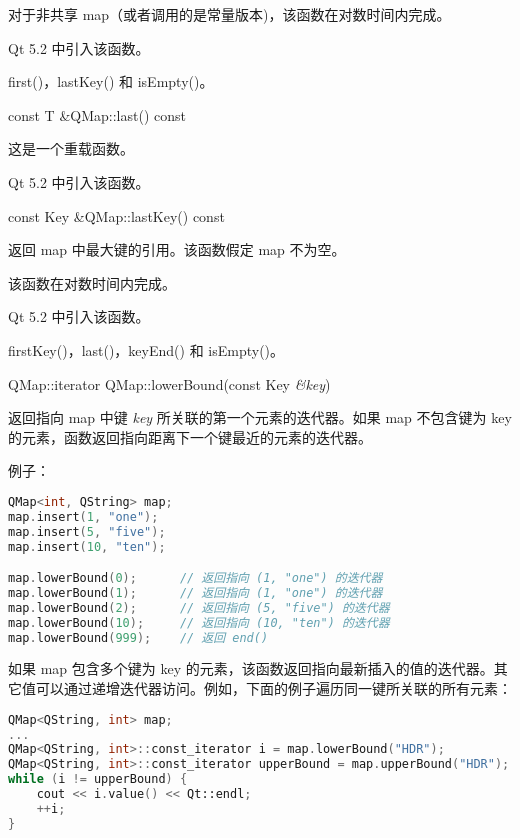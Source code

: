 对于非共享 map（或者调用的是常量版本)，该函数在对数时间内完成。

Qt 5.2 中引入该函数。

\begin{seeAlso}
first()，lastKey() 和 isEmpty()。
\end{seeAlso}

\splitLine

const T \&QMap::last() const

这是一个重载函数。

Qt 5.2 中引入该函数。

\splitLine

const Key \&QMap::lastKey() const

返回 map 中最大键的引用。该函数假定 map 不为空。

该函数在对数时间内完成。

Qt 5.2 中引入该函数。

\begin{seeAlso}
firstKey()，last()，keyEnd() 和 isEmpty()。
\end{seeAlso}

\splitLine

QMap::iterator QMap::lowerBound(const Key \emph{\&key})

返回指向 map 中键 \emph{key} 所关联的第一个元素的迭代器。如果 map 不包含键为 key 的元素，函数返回指向距离下一个键最近的元素的迭代器。

例子：

\begin{lstlisting}[language=C++]
QMap<int, QString> map;
map.insert(1, "one");
map.insert(5, "five");
map.insert(10, "ten");

map.lowerBound(0);      // 返回指向 (1, "one") 的迭代器
map.lowerBound(1);      // 返回指向 (1, "one") 的迭代器
map.lowerBound(2);      // 返回指向 (5, "five") 的迭代器
map.lowerBound(10);     // 返回指向 (10, "ten") 的迭代器
map.lowerBound(999);    // 返回 end()
\end{lstlisting}

如果 map 包含多个键为 key 的元素，该函数返回指向最新插入的值的迭代器。其它值可以通过递增迭代器访问。例如，下面的例子遍历同一键所关联的所有元素：

\begin{lstlisting}[language=C++]
QMap<QString, int> map;
...
QMap<QString, int>::const_iterator i = map.lowerBound("HDR");
QMap<QString, int>::const_iterator upperBound = map.upperBound("HDR");
while (i != upperBound) {
    cout << i.value() << Qt::endl;
    ++i;
}
\end{lstlisting}

